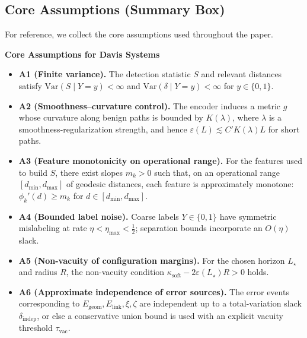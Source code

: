 \documentclass[11pt]{article}
\newcommand{\Var}{\mathrm{Var}}
\begin{document}
\subsection{Core Assumptions (Summary Box)}
\label{subsec:assumptions}

For reference, we collect the core assumptions used throughout the paper.

\begin{samepage}
\begin{mdframed}[linewidth=0.5pt]
\noindent\textbf{Core Assumptions for Davis Systems}
\begin{itemize}[leftmargin=*]
    \item \textbf{A1 (Finite variance).} The detection statistic $S$ and relevant distances
    satisfy $\Var(S \mid Y=y) < \infty$ and $\Var(\delta \mid Y=y) < \infty$ for $y\in\{0,1\}$.

    \item \textbf{A2 (Smoothness--curvature control).} The encoder induces a metric $g$
    whose curvature along benign paths is bounded by $K(\lambda)$, where $\lambda$ is a
    smoothness-regularization strength, and hence $\varepsilon(L) \lesssim C' K(\lambda) L$
    for short paths.

    \item \textbf{A3 (Feature monotonicity on operational range).} For the features used
    to build $S$, there exist slopes $m_k>0$ such that, on an operational range
    $[d_{\min},d_{\max}]$ of geodesic distances, each feature is approximately monotone:
    $\phi_k'(d) \ge m_k$ for $d\in[d_{\min},d_{\max}]$.

    \item \textbf{A4 (Bounded label noise).} Coarse labels $Y\in\{0,1\}$ have symmetric
    mislabeling at rate $\eta < \eta_{\max} < \tfrac{1}{2}$; separation bounds incorporate
    an $O(\eta)$ slack.

    \item \textbf{A5 (Non-vacuity of configuration margins).} For the chosen horizon
    $L_\star$ and radius $R$, the non-vacuity condition
    $\kappa_{\mathrm{soft}} - 2 \varepsilon(L_\star) R > 0$ holds.

    \item \textbf{A6 (Approximate independence of error sources).} The error events
    corresponding to $E_{\text{geom}},E_{\text{link}},\xi,\zeta$ are independent up to a
    total-variation slack $\delta_{\text{indep}}$, or else a conservative union bound is
    used with an explicit vacuity threshold $\tau_{\text{vac}}$.
\end{itemize}
\end{mdframed}
\end{samepage}
\end{document}
